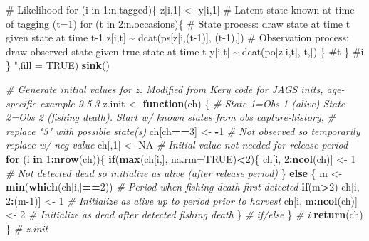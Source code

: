 \documentclass[
]{krantz}
\makeatletter
\newenvironment{Shaded}{\begin{snugshade}}{\end{snugshade}}
\newcommand{\AttributeTok}[1]{\textcolor[rgb]{0.27,0.27,0.27}{#1}}
\newcommand{\CommentTok}[1]{\textcolor[rgb]{0.37,0.37,0.37}{\textit{#1}}}
\newcommand{\ConstantTok}[1]{\textcolor[rgb]{0.37,0.37,0.37}{#1}}
\newcommand{\ControlFlowTok}[1]{\textcolor[rgb]{0.27,0.27,0.27}{\textbf{#1}}}
\newcommand{\DecValTok}[1]{\textcolor[rgb]{0.06,0.06,0.06}{#1}}
\newcommand{\FunctionTok}[1]{\textcolor[rgb]{0.27,0.27,0.27}{\textbf{#1}}}
\newcommand{\NormalTok}[1]{#1}
\newcommand{\OtherTok}[1]{\textcolor[rgb]{0.37,0.37,0.37}{#1}}
\newcommand{\SpecialCharTok}[1]{\textcolor[rgb]{0.43,0.43,0.43}{\textbf{#1}}}
\newcommand{\StringTok}[1]{\textcolor[rgb]{0.5,0.5,0.5}{#1}}
\newenvironment{kframe}{%
\medskip{}
\setlength{\fboxsep}{.8em}
 \def\at@end@of@kframe{}%
 \ifinner\ifhmode%
  \def\at@end@of@kframe{\end{minipage}}%
  \begin{minipage}{\columnwidth}%
 \fi\fi%
 \def\FrameCommand##1{\hskip\@totalleftmargin \hskip-\fboxsep
 \colorbox{shadecolor}{##1}\hskip-\fboxsep
     \hskip-\linewidth \hskip-\@totalleftmargin \hskip\columnwidth}%
 \MakeFramed {\advance\hsize-\width
   \@totalleftmargin\z@ \linewidth\hsize
   \@setminipage}}%
 {\par\unskip\endMakeFramed%
 \at@end@of@kframe}
\renewenvironment{Shaded}{\begin{kframe}}{\end{kframe}}
\makeatother
\begin{document}
\begin{Shaded}
\begin{Highlighting}[]
\StringTok{    \# Likelihood}
\StringTok{    for (i in 1:n.tagged)\{}
\StringTok{    z[i,1] \textless{}{-} y[i,1] \# Latent state known at time of tagging (t=1)}
\StringTok{    for (t in 2:n.occasions)\{}
\StringTok{    \# State process: draw state at time t given state at time t{-}1}
\StringTok{    z[i,t] \textasciitilde{} dcat(ps[z[i,(t{-}1)], (t{-}1),])}
\StringTok{    \# Observation process: draw observed state given true state at time t}
\StringTok{    y[i,t] \textasciitilde{} dcat(po[z[i,t], t,])}
\StringTok{    \} \#t}
\StringTok{    \} \#i}
\StringTok{\}}
\StringTok{    "}\NormalTok{,}\AttributeTok{fill =} \ConstantTok{TRUE}\NormalTok{)}
\FunctionTok{sink}\NormalTok{()}

\CommentTok{\# Generate initial values for z. Modified from Kery code for JAGS inits, age{-}specific example 9.5.3}
\NormalTok{z.init }\OtherTok{\textless{}{-}} \ControlFlowTok{function}\NormalTok{(ch) \{}
  \CommentTok{\# State 1=Obs 1 (alive) State 2=Obs 2 (fishing death). Start w/ known states from obs capture{-}history,}
  \CommentTok{\# replace "3" with possible state(s)}
\NormalTok{  ch[ch}\SpecialCharTok{==}\DecValTok{3}\NormalTok{] }\OtherTok{\textless{}{-}} \SpecialCharTok{{-}}\DecValTok{1}  \CommentTok{\# Not observed so temporarily replace w/ neg value}
\NormalTok{  ch[,}\DecValTok{1}\NormalTok{] }\OtherTok{\textless{}{-}} \ConstantTok{NA}  \CommentTok{\# Initial value not needed for release period}
  \ControlFlowTok{for}\NormalTok{ (i }\ControlFlowTok{in} \DecValTok{1}\SpecialCharTok{:}\FunctionTok{nrow}\NormalTok{(ch))\{}
    \ControlFlowTok{if}\NormalTok{(}\FunctionTok{max}\NormalTok{(ch[i,], }\AttributeTok{na.rm=}\ConstantTok{TRUE}\NormalTok{)}\SpecialCharTok{\textless{}}\DecValTok{2}\NormalTok{)\{}
\NormalTok{      ch[i, }\DecValTok{2}\SpecialCharTok{:}\FunctionTok{ncol}\NormalTok{(ch)] }\OtherTok{\textless{}{-}} \DecValTok{1} \CommentTok{\# Not detected dead so initialize as alive (after release period)}
\NormalTok{      \} }\ControlFlowTok{else}\NormalTok{ \{}
\NormalTok{      m }\OtherTok{\textless{}{-}} \FunctionTok{min}\NormalTok{(}\FunctionTok{which}\NormalTok{(ch[i,]}\SpecialCharTok{==}\DecValTok{2}\NormalTok{))  }\CommentTok{\# Period when fishing death first detected}
      \ControlFlowTok{if}\NormalTok{(m}\SpecialCharTok{\textgreater{}}\DecValTok{2}\NormalTok{) ch[i, }\DecValTok{2}\SpecialCharTok{:}\NormalTok{(m}\DecValTok{{-}1}\NormalTok{)] }\OtherTok{\textless{}{-}} \DecValTok{1}  \CommentTok{\# Initialize as alive up to period prior to harvest}
\NormalTok{      ch[i, m}\SpecialCharTok{:}\FunctionTok{ncol}\NormalTok{(ch)] }\OtherTok{\textless{}{-}} \DecValTok{2}  \CommentTok{\# Initialize as dead after detected fishing death}
\NormalTok{      \} }\CommentTok{\# if/else}
\NormalTok{\} }\CommentTok{\# i}
  \FunctionTok{return}\NormalTok{(ch)}
\NormalTok{\} }\CommentTok{\# z.init}


\end{Highlighting}
\end{Shaded}
\end{document}
